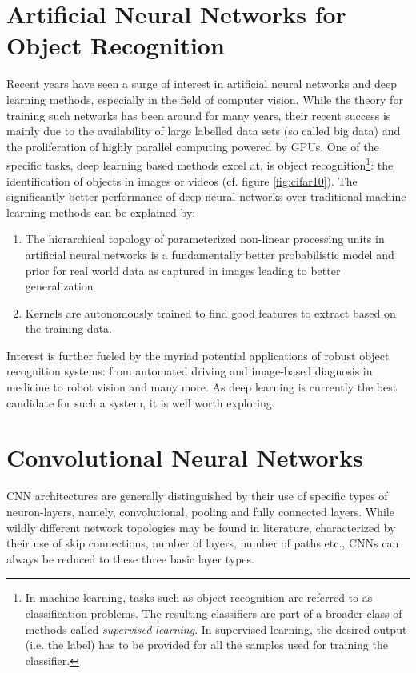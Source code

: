 \section{Artificial Neural Networks for Object Recognition}
Recent years have seen a surge of interest in artificial neural networks and deep learning methods, especially in the field of computer vision. While the theory for training such networks has been around for many years, their recent success is mainly due to the availability of large labelled data sets (so called big data) and the proliferation of highly parallel computing powered by GPUs. One of the specific tasks, deep learning based methods excel at, is object recognition\footnote{In machine learning, tasks such as object recognition are referred to as classification problems. The resulting classifiers are part of a broader class of methods called \emph{supervised learning}. In supervised learning, the desired output (i.e. the label) has to be provided for all the samples used for training the classifier.}: the identification of objects in images or videos (cf. figure \ref{fig:cifar10}). The significantly better performance of deep neural networks over traditional machine learning methods can be explained by: 
\begin{enumerate}
    \item The hierarchical topology of parameterized non-linear processing units in artificial neural networks is a fundamentally better probabilistic model and prior for real world data as captured in images leading to better generalization
    \item Kernels are autonomously trained to find good features to extract based on the training data.
\end{enumerate}
Interest is further fueled by the myriad potential applications of robust object recognition systems: from automated driving and image-based diagnosis in medicine to robot vision and many more. As deep learning is currently the best candidate for such a system, it is well worth exploring.
\section{Convolutional Neural Networks}\label{section:cnn}
CNN architectures are generally distinguished by their use of specific types of neuron-layers, namely, convolutional, pooling and fully connected layers. While wildly different network topologies may be found in literature, characterized by their use of skip connections, number of layers, number of paths etc., CNNs can always be reduced to these three basic layer types.
